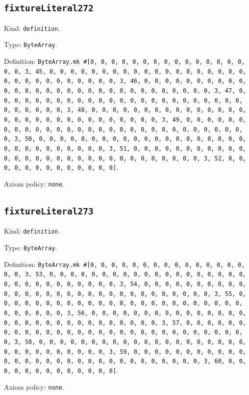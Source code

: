 \documentclass[11pt]{article}
\begin{document}
\subsection*{\texttt{fixtureLiteral272}}
\noindent Kind: \texttt{definition}.\par
\noindent Type: \texttt{ByteArray}.\par
\noindent Definition: \texttt{ByteArray.mk \#[0, 0, 0, 0, 0, 0, 0, 0, 0, 0, 0, 0, 0, 0, 0, 0, 0, 3, 45, 0, 0, 0, 0, 0, 0, 0, 0, 0, 0, 0, 0, 0, 0, 0, 0, 0, 0, 0, 0, 0, 0, 0, 0, 0, 0, 0, 0, 0, 0, 3, 46, 0, 0, 0, 0, 0, 0, 0, 0, 0, 0, 0, 0, 0, 0, 0, 0, 0, 0, 0, 0, 0, 0, 0, 0, 0, 0, 0, 0, 0, 0, 3, 47, 0, 0, 0, 0, 0, 0, 0, 0, 0, 0, 0, 0, 0, 0, 0, 0, 0, 0, 0, 0, 0, 0, 0, 0, 0, 0, 0, 0, 0, 0, 3, 48, 0, 0, 0, 0, 0, 0, 0, 0, 0, 0, 0, 0, 0, 0, 0, 0, 0, 0, 0, 0, 0, 0, 0, 0, 0, 0, 0, 0, 0, 0, 3, 49, 0, 0, 0, 0, 0, 0, 0, 0, 0, 0, 0, 0, 0, 0, 0, 0, 0, 0, 0, 0, 0, 0, 0, 0, 0, 0, 0, 0, 0, 0, 3, 50, 0, 0, 0, 0, 0, 0, 0, 0, 0, 0, 0, 0, 0, 0, 0, 0, 0, 0, 0, 0, 0, 0, 0, 0, 0, 0, 0, 0, 0, 0, 3, 51, 0, 0, 0, 0, 0, 0, 0, 0, 0, 0, 0, 0, 0, 0, 0, 0, 0, 0, 0, 0, 0, 0, 0, 0, 0, 0, 0, 0, 0, 0, 3, 52, 0, 0, 0, 0, 0, 0, 0, 0, 0, 0, 0, 0, 0]}.\par
\noindent Axiom policy: \texttt{none}.\par
\subsection*{\texttt{fixtureLiteral273}}
\noindent Kind: \texttt{definition}.\par
\noindent Type: \texttt{ByteArray}.\par
\noindent Definition: \texttt{ByteArray.mk \#[0, 0, 0, 0, 0, 0, 0, 0, 0, 0, 0, 0, 0, 0, 0, 0, 0, 3, 53, 0, 0, 0, 0, 0, 0, 0, 0, 0, 0, 0, 0, 0, 0, 0, 0, 0, 0, 0, 0, 0, 0, 0, 0, 0, 0, 0, 0, 0, 0, 3, 54, 0, 0, 0, 0, 0, 0, 0, 0, 0, 0, 0, 0, 0, 0, 0, 0, 0, 0, 0, 0, 0, 0, 0, 0, 0, 0, 0, 0, 0, 0, 3, 55, 0, 0, 0, 0, 0, 0, 0, 0, 0, 0, 0, 0, 0, 0, 0, 0, 0, 0, 0, 0, 0, 0, 0, 0, 0, 0, 0, 0, 0, 0, 3, 56, 0, 0, 0, 0, 0, 0, 0, 0, 0, 0, 0, 0, 0, 0, 0, 0, 0, 0, 0, 0, 0, 0, 0, 0, 0, 0, 0, 0, 0, 0, 3, 57, 0, 0, 0, 0, 0, 0, 0, 0, 0, 0, 0, 0, 0, 0, 0, 0, 0, 0, 0, 0, 0, 0, 0, 0, 0, 0, 0, 0, 0, 0, 3, 58, 0, 0, 0, 0, 0, 0, 0, 0, 0, 0, 0, 0, 0, 0, 0, 0, 0, 0, 0, 0, 0, 0, 0, 0, 0, 0, 0, 0, 0, 0, 3, 59, 0, 0, 0, 0, 0, 0, 0, 0, 0, 0, 0, 0, 0, 0, 0, 0, 0, 0, 0, 0, 0, 0, 0, 0, 0, 0, 0, 0, 0, 0, 3, 60, 0, 0, 0, 0, 0, 0, 0, 0, 0, 0, 0, 0, 0]}.\par
\noindent Axiom policy: \texttt{none}.\par
\end{document}
